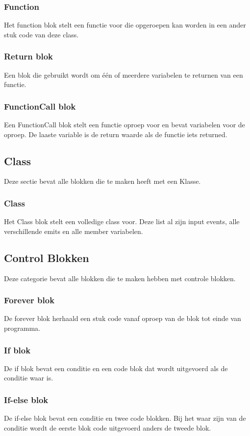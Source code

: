 \documentclass[]{article}
\begin{document}
\subsubsection{Function}
Het function blok stelt een functie voor die opgeroepen kan worden in een ander stuk code van deze class. 
\subsubsection{Return blok}
Een blok die gebruikt wordt om \'{e}\'{e}n of meerdere variabelen te returnen van een functie.
\subsubsection{FunctionCall blok}
Een FunctionCall blok stelt een functie oproep voor en bevat variabelen voor de oproep.
De laaste variable is de return waarde als de functie iets returned.

\subsection{Class}
Deze sectie bevat alle blokken die te maken heeft met een Klasse.
\subsubsection{Class}
Het Class blok stelt een volledige class voor. Deze list al zijn input events, alle verschillende emits en alle member variabelen.

\subsection{Control Blokken}
Deze categorie bevat alle blokken die te maken hebben met controle blokken.
\subsubsection{Forever blok}
De forever blok herhaald een stuk code vanaf oproep van de blok tot einde van programma.
\subsubsection{If blok}
De if blok bevat een conditie en een code blok dat wordt uitgevoerd als de conditie waar is.
\subsubsection{If-else blok}
De if-else blok bevat een conditie en twee code blokken. Bij het waar zijn van de conditie wordt de eerste blok code uitgevoerd anders de tweede blok.
\end{document}
